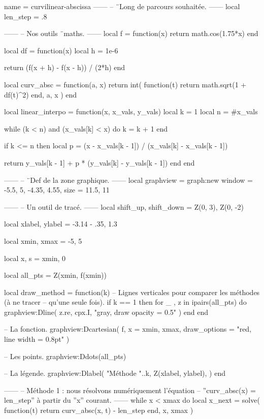 \documentclass{standalone}
\begin{document}
\begin{luadraw}{name = curvilinear-abscissa}
------
-- ¨Long de parcours souhaitée.
------
local len_step = .8

------
-- Nos outils ¨maths.
------
local f = function(x)
  return math.cos(1.75*x)
end

local df = function(x)
  local h = 1e-6

  return (f(x + h) - f(x - h)) / (2*h)
end

local curv_absc = function(a, x)
  return int(
    function(t)
      return math.sqrt(1 + df(t)^2)
    end,
    a, x
  )
end

local linear_interpo = function(x, x_vals, y_vals)
  local k = 1
  local n = #x_vals

  while (k < n) and (x_vals[k] < x) do
    k = k + 1
  end

  if k <= n then
    local p = (x - x_vals[k - 1]) / (x_vals[k] - x_vals[k - 1])

    return y_vals[k - 1] + p * (y_vals[k] - y_vals[k - 1])
  end
end

------
-- ¨Def de la zone graphique.
------
local graphview = graph:new{
  window = {-5.5, 5, -4.35, 4.55},
  size   = {11.5, 11}
}

------
-- Un outil de tracé.
------
local shift_up, shift_down = Z(0, 3), Z(0, -2)

local xlabel, ylabel = -3.14 - .35, 1.3

local xmin, xmax = -5, 5

local x, s = xmin, 0

local all_pts = {Z(xmin, f(xmin))}

local draw_method = function(k)
-- Lignes verticales pour comparer les méthodes (à ne tracer
-- qu'une seule fois).
  if k == 1 then
    for _ , z in ipairs(all_pts) do
      graphview:Dline(
        {z.re, cpx.I},
        "gray, draw opacity = 0.5"
      )
    end
  end

-- La fonction.
  graphview:Dcartesian(
    f,
    {
      x = {xmin, xmax},
      draw_options = "red, line width = 0.8pt"
    }
  )

-- Les points.
  graphview:Ddots(all_pts)

-- La légende.
  graphview:Dlabel(
    "Méthode "..k, Z(xlabel, ylabel), {}
  )
end

------
-- Méthode 1 : nous résolvons numériquement l'équation
-- ''curv_absc(x) = len_step'' à partir du ''x'' courant.
------
while x < xmax do
  local x_next = solve(
    function(t)
      return curv_absc(x, t) - len_step
    end,
    x, xmax
  )


\end{luadraw}
\end{document}
